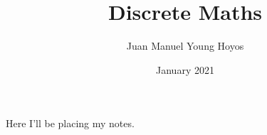 \documentclass{article}
\title{Discrete Maths}
\author{Juan Manuel Young Hoyos}
\date{January 2021}
\begin{document}
   \maketitle
   Here I'll be placing my notes.
\end{document}
